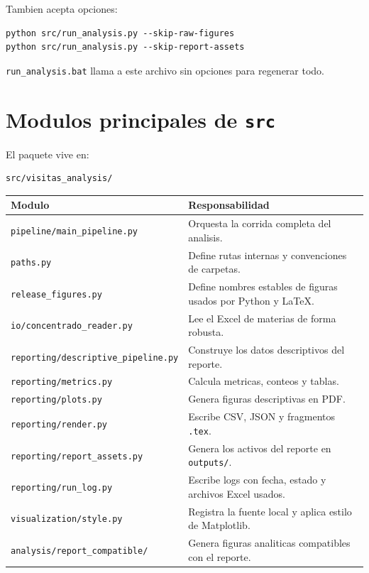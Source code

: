 \documentclass[11pt,letterpaper]{article}
\newcommand{\code}[1]{\texttt{#1}}
\begin{document}
Tambien acepta opciones:

\begin{verbatim}
python src/run_analysis.py --skip-raw-figures
python src/run_analysis.py --skip-report-assets
\end{verbatim}

\code{run\_analysis.bat} llama a este archivo sin opciones para
regenerar todo.

\section{Modulos principales de \code{src}}

\begin{summary}
El paquete vive en:

\begin{verbatim}
src/visitas_analysis/
\end{verbatim}
\end{summary}

\begin{longtable}{p{} p{}}
\toprule
\textbf{Modulo} & \textbf{Responsabilidad} \\
\midrule
\endhead
\code{pipeline/main\_pipeline.py} & Orquesta la corrida completa del analisis. \\
\code{paths.py} & Define rutas internas y convenciones de carpetas. \\
\code{release\_figures.py} & Define nombres estables de figuras usados por Python y LaTeX. \\
\code{io/concentrado\_reader.py} & Lee el Excel de materias de forma robusta. \\
\code{reporting/descriptive\_pipeline.py} & Construye los datos descriptivos del reporte. \\
\code{reporting/metrics.py} & Calcula metricas, conteos y tablas. \\
\code{reporting/plots.py} & Genera figuras descriptivas en PDF. \\
\code{reporting/render.py} & Escribe CSV, JSON y fragmentos \code{.tex}. \\
\code{reporting/report\_assets.py} & Genera los activos del reporte en \code{outputs/}. \\
\code{reporting/run\_log.py} & Escribe logs con fecha, estado y archivos Excel usados. \\
\code{visualization/style.py} & Registra la fuente local y aplica estilo de Matplotlib. \\
\code{analysis/report\_compatible/} & Genera figuras analiticas compatibles con el reporte. \\
\bottomrule
\end{longtable}
\end{document}
